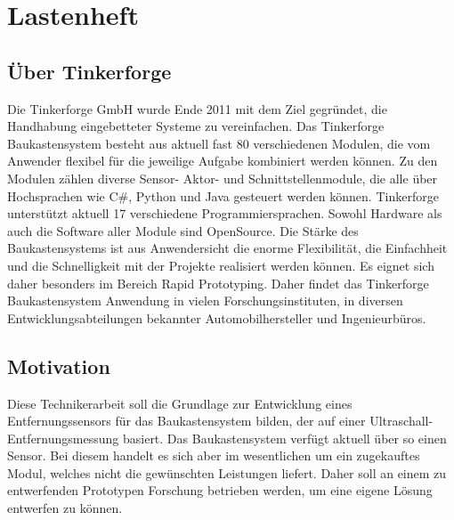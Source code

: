 \section{Lastenheft}
\subsection{Über Tinkerforge}
Die  Tinkerforge  GmbH  wurde  Ende  2011  mit  dem  Ziel  gegründet,  die  Handhabung eingebetteter  Systeme  zu  vereinfachen.  Das  Tinkerforge  Baukastensystem  besteht  aus aktuell fast 80 verschiedenen Modulen, die vom Anwender flexibel für die jeweilige Aufgabe  kombiniert  werden  können.  Zu  den  Modulen  zählen  diverse  Sensor-  Aktor-  und Schnittstellenmodule, die alle über Hochsprachen wie C\#, Python und Java gesteuert werden können. Tinkerforge unterstützt aktuell 17 verschiedene Programmiersprachen. Sowohl Hardware als auch die Software aller Module sind OpenSource. Die Stärke des Baukastensystems  ist  aus  Anwendersicht  die  enorme  Flexibilität,  die  Einfachheit  und
die Schnelligkeit mit der Projekte realisiert werden können. Es eignet sich daher besonders im Bereich Rapid Prototyping. Daher findet das Tinkerforge Baukastensystem Anwendung in vielen Forschungsinstituten, in diversen Entwicklungsabteilungen bekannter Automobilhersteller und Ingenieurbüros.
\subsection{Motivation}
Diese Technikerarbeit soll die Grundlage zur Entwicklung eines Entfernungssensors für das Baukastensystem bilden, der auf einer Ultraschall-Entfernungsmessung basiert. Das Baukastensystem verfügt aktuell über so einen Sensor. Bei diesem handelt es sich aber im wesentlichen um ein zugekauftes Modul, welches nicht die gewünschten Leistungen liefert. Daher soll an einem zu entwerfenden Prototypen Forschung betrieben werden, um eine eigene Lösung entwerfen zu können.
